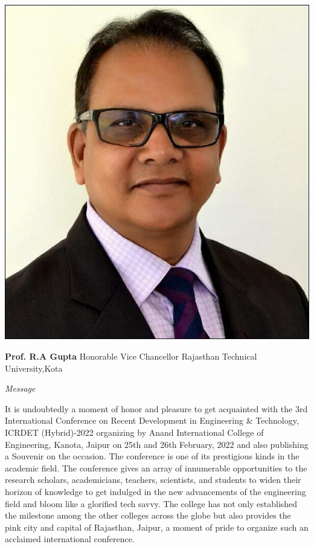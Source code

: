 \documentclass[twoside,11pt]{amsart}
\begin{document}
\newpage
%
%
%
%
\newpage
\begin{flushright}
\includegraphics[height=8\baselineskip]{RG1}
\end{flushright}
\vskip 1mm
\hfill \textbf{Prof. R.A Gupta}
\vskip 1mm
\hfill Honorable  Vice Chancellor
\vskip 1mm
\hfill Rajasthan Technical University,Kota
\vskip 10mm
\centerline {\huge{\emph{Message}}}
\vskip 5mm
It is undoubtedly a moment of honor and pleasure to get acquainted with the 3rd International Conference on Recent Development in Engineering \& Technology, ICRDET (Hybrid)-2022 organizing by Anand International College of Engineering, Kanota, Jaipur on 25th and 26th February, 2022 and also publishing a Souvenir on the occasion. The conference is one of its prestigious kinds in the academic field. The conference gives an array of innumerable opportunities to the research scholars, academicians, teachers, scientists, and students to widen their horizon of knowledge to get indulged in the new advancements of the engineering field and bloom like a glorified tech savvy. The college has not only established the milestone among the other colleges across the globe but also provides the pink city and capital of Rajasthan, Jaipur, a moment of pride to organize such an acclaimed international conference.
\end{document}
